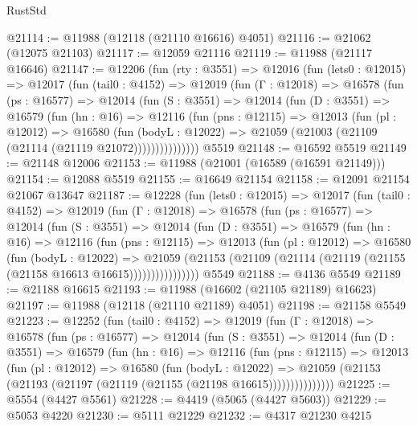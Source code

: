 \begin{lexlean}{RustStd}
\begin{coremodule}
@21114 := @11988 (@12118 (@21110 @16616) @4051)
@21116 := @21062 (@12075 @21103)
@21117 := @12059 @21116
@21119 := @11988 (@21117 @16646)
@21147 := @12206
    (fun (rty : @3551) =>
    @12016
      (fun (lets0 : @12015) =>
      @12017
        (fun (tail0 : @4152) =>
        @12019
          (fun (Γ : @12018) =>
          @16578
            (fun (ps : @16577) =>
            @12014
              (fun (S : @3551) =>
              @12014
                (fun (D : @3551) =>
                @16579
                  (fun (hn : @16) =>
                  @12116
                    (fun (pns : @12115) =>
                    @12013
                      (fun (pl : @12012) =>
                      @16580
                        (fun (bodyL : @12022) =>
                        @21059 (@21003 (@21109 (@21114 (@21119 @21072)))))))))))))))
    @5519
@21148 := @16592 @5519
@21149 := @21148 @12006
@21153 := @11988 (@21001 (@16589 (@16591 @21149)))
@21154 := @12088 @5519
@21155 := @16649 @21154
@21158 := @12091 @21154 @21067 @13647
@21187 := @12228
    (fun (lets0 : @12015) =>
    @12017
      (fun (tail0 : @4152) =>
      @12019
        (fun (Γ : @12018) =>
        @16578
          (fun (ps : @16577) =>
          @12014
            (fun (S : @3551) =>
            @12014
              (fun (D : @3551) =>
              @16579
                (fun (hn : @16) =>
                @12116
                  (fun (pns : @12115) =>
                  @12013
                    (fun (pl : @12012) =>
                    @16580
                      (fun (bodyL : @12022) =>
                      @21059
                        (@21153
                          (@21109 (@21114 (@21119 (@21155 (@21158 @16613 @16615))))))))))))))))
    @5549
@21188 := @4136 @5549
@21189 := @21188 @16615
@21193 := @11988 (@16602 (@21105 @21189) @16623)
@21197 := @11988 (@12118 (@21110 @21189) @4051)
@21198 := @21158 @5549
@21223 := @12252
    (fun (tail0 : @4152) =>
    @12019
      (fun (Γ : @12018) =>
      @16578
        (fun (ps : @16577) =>
        @12014
          (fun (S : @3551) =>
          @12014
            (fun (D : @3551) =>
            @16579
              (fun (hn : @16) =>
              @12116
                (fun (pns : @12115) =>
                @12013
                  (fun (pl : @12012) =>
                  @16580
                    (fun (bodyL : @12022) =>
                    @21059 (@21153 (@21193 (@21197 (@21119 (@21155 (@21198 @16615)))))))))))))))
@21225 := @5554 (@4427 @5561)
@21228 := @4419 (@5065 (@4427 @5603))
@21229 := @5053 @4220
@21230 := @5111 @21229
@21232 := @4317 @21230 @4215

\end{coremodule}
\end{lexlean}

